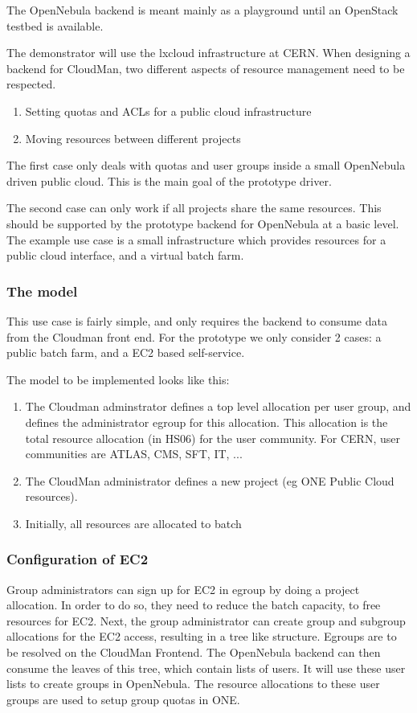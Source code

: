 The OpenNebula backend is meant mainly as a playground until an OpenStack testbed is available. 

The demonstrator will use the lxcloud infrastructure at CERN.
When designing a backend for CloudMan, two different aspects of resource management need to be respected. 
\begin{enumerate}
\item Setting quotas and ACLs for a public cloud infrastructure
\item Moving resources between different projects
\end{enumerate}

The first case only deals with quotas and user groups inside a small OpenNebula driven public cloud. This is the main goal of the prototype driver. 

The second case can only work if all projects share the same resources. This should be supported by the prototype backend for OpenNebula at a basic level. The example use case is a small infrastructure which provides resources for a public cloud interface, and a virtual batch farm.


\subsubsection{The model}
This use case is fairly simple, and only requires the backend to consume data from the Cloudman front end. 
For the prototype we only consider 2 cases: a public batch farm, and a EC2 based self-service.

The model to be implemented looks like this:
\begin{enumerate}
\item The Cloudman adminstrator defines a top level allocation per user group, and defines the administrator egroup for this allocation. This allocation is the total resource allocation (in HS06) for the user community. For CERN, user communities are ATLAS, CMS, SFT, IT, ...
\item The CloudMan administrator defines a new project (eg ONE Public Cloud resources). 
\item Initially, all resources are allocated to batch
\end{enumerate}

\subsubsection{Configuration of EC2}
Group administrators can sign up for EC2 in egroup by doing a project allocation. In order to do so, they  need to reduce the batch capacity, to free resources for EC2. Next, the group administrator can create group and subgroup allocations for the EC2 access, resulting in a tree like structure. 
Egroups are to be resolved on the CloudMan Frontend.
The OpenNebula backend can then consume the leaves of this tree, which contain lists of users. It will use these user lists to create groups 
in OpenNebula. The resource allocations to these user groups are used to setup group quotas in ONE. 

